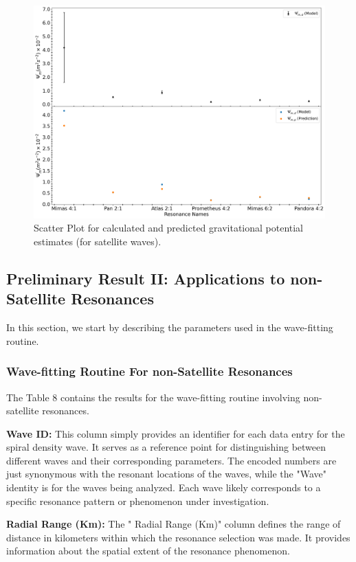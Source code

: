 \documentclass{article}
\begin{document}

\begin{figure}
    \centering
    \includegraphics[width=0.8\linewidth]{satellitepotentialUpdated.png}
    \caption{Scatter Plot for calculated and predicted gravitational potential estimates (for satellite waves).}
    \label{fig:enter-label}
\end{figure}

\subsection{Preliminary Result II: Applications to non-Satellite Resonances}
In this section, we start by describing the parameters used in the wave-fitting routine.

\subsubsection{Wave-fitting Routine For non-Satellite Resonances}
The Table 8 contains the results for the wave-fitting routine involving non-satellite resonances.

\textbf{Wave ID:} This column simply provides an identifier for each data entry for the spiral density wave. It serves as a reference point for distinguishing between different waves and their corresponding parameters. The encoded numbers are just synonymous with the resonant locations of the waves, while the "Wave" identity is for the waves being analyzed. Each wave likely corresponds to a specific resonance pattern or phenomenon under investigation.

\textbf{Radial Range (Km):} The " Radial Range (Km)" column defines the range of distance in kilometers within which the resonance selection was made. It provides information about the spatial extent of the resonance phenomenon.
    
\end{document}
